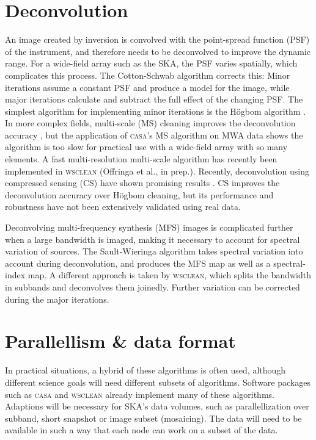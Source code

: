 \documentclass[9pt,conference,a4paper]{IEEEtran}
\begin{document}
\section{Deconvolution}
An image created by inversion is convolved with the point-spread function (PSF) of the instrument, and therefore needs to be deconvolved to improve the dynamic range. For a wide-field array such as the SKA, the PSF varies spatially, which complicates this process. The Cotton-Schwab algorithm \cite{cotton-schwab-clean} corrects this: Minor iterations assume a constant PSF and produce a model for the image, while major iterations calculate and subtract the full effect of the changing PSF. The simplest algorithm for implementing minor iterations is the H\"ogbom algorithm \cite{hogbom-clean}. In more complex fields, multi-scale (MS) cleaning improves the deconvolution accuracy \cite{multiscale-clean-cornwell-2008}, but the application of \textsc{casa}'s MS algorithm on MWA data shows the algorithm is too slow for practical use with a wide-field array with so many elements. A fast multi-resolution multi-scale algorithm has recently been implemented in \textsc{wsclean} (Offringa et al., in prep.). Recently, deconvolution using compressed sensing (CS) have shown promising results \cite{wenger-compressed-sensing-2010}. CS improves the deconvolution accuracy over H\"ogbom cleaning, but its performance and robustness have not been extensively validated using real data.

Deconvolving multi-frequency synthesis (MFS) images is complicated further when a large bandwidth is imaged, making it necessary to account for spectral variation of sources. The Sault-Wieringa algorithm \cite{sault-wieringa-1994} takes spectral variation into account during deconvolution, and produces the MFS map as well as a spectral-index map. A different approach is taken by \textsc{wsclean}, which splits the bandwidth in subbands and deconvolves them joinedly. Further variation can be corrected during the major iterations.

\section{Parallellism \& data format}
In practical situations, a hybrid of these algorithms is often used, although different science goals will need different subsets of algorithms. Software packages such as \textsc{casa} and \textsc{wsclean} already implement many of these algorithms. Adaptions will be necessary for SKA's data volumes, such as parallellization over subband, short snapshot or image subset (mosaicing). The data will need to be available in such a way that each node can work on a subset of the data.

\DeclareRobustCommand{\TUSSEN}[3]{#3}



\end{document}
